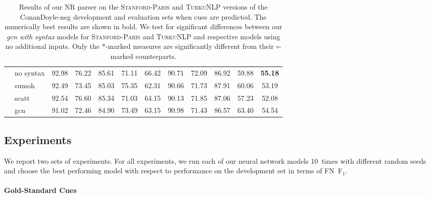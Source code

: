 \documentclass[11pt,a4paper]{article}
\theoremstyle{plain}
\def\fscore{F$_1$}
\begin{document}
\begin{table*}[]
{\begin{tabular}{l l c c  c  c  c c c c c c}
        		& \multirow{1}{*}{no syntax}
                & 92.98 & 76.22\rlap{${}^*$} & 85.61 & 71.11 & 66.42 & 90.71 & 72.09 & 86.92 & 59.88 & \textbf{55.18} \\
        		& \multirow{1}{*}{sumoh}
                & 92.49 & 73.45 & 85.03 & 75.35 & 62.31 & 90.66 & 71.73 & 87.91 & 60.06 & 53.19 \\
        		& \multirow{1}{*}{scatt}
                & 92.54 & 76.60 & 85.34 & 71.03 & 64.15 & 90.13 & 71.85 & 87.06 & 57.23 & 52.08 \\
        		& \multirow{1}{*}{gcn}
                & 91.02 & 72.46\rlap{${}^\circ$} & 84.90 & 73.49 & 63.15 & 90.98 & 71.43 & 86.57 & 63.40 & 54.54 \\
	\bottomrule
\end{tabular}
}
\caption{Results of our NR parser on the \textsc{Stanford-Paris} and \textsc{TurkuNLP} versions of the ConanDoyle-neg development and evaluation sets when cues are predicted.
  The numerically best results are shown in bold.
    We test for significant differences between our \emph{gcn with syntax} models for \textsc{Stanford-Paris}
    and \textsc{TurkuNLP} and respective models using no additional
    inputs.
    Only the $*$-marked measures are significantly different from their $\circ$-marked counterparts.
}
    \label{tab:pred_results}
\end{table*}


\subsection{Experiments}

We report two sets of experiments.
For all experiments, we run each of our neural network models 10~times
with different random seeds and choose the best performing model with
respect to performance on the development set in terms of FN~\fscore.

\paragraph{Gold-Standard Cues}
\end{document}
